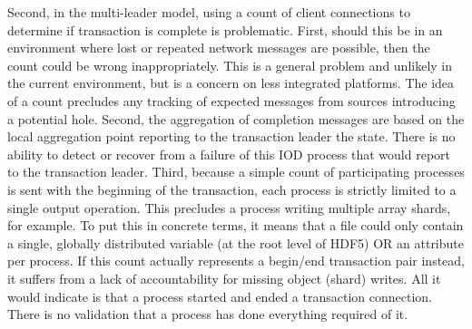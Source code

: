 \documentclass[conference]{sig-alt-gov2}
\begin{document}
Second, in the multi-leader model, using a count of client connections to
determine if transaction is complete is problematic.  First, should this be in
an environment where lost or repeated network messages are possible, then the
count could be wrong inappropriately. This is a general problem and unlikely
in the current environment, but is a concern on less integrated platforms.
The idea of a count precludes any tracking of expected messages from sources
introducing a potential hole. Second, the aggregation of completion messages
are based on the local aggregation point reporting to the transaction
leader the state.  There is no ability to detect or recover from a failure of
this IOD process that would report to the transaction leader. Third, because a
simple count of participating processes is sent with the beginning of the
transaction, each process is strictly limited to a single output operation.
This precludes a process writing multiple array shards, for example. To put
this in concrete terms, it means that a file could only contain a single,
globally distributed variable (at the root level of HDF5) OR an attribute per
process. If this count actually represents a begin/end transaction pair
instead, it suffers from a lack of accountability for missing object (shard)
writes. All it would indicate is that a process started and ended a transaction
connection. There is no validation that a process has done everything required
of it.
\end{document}
